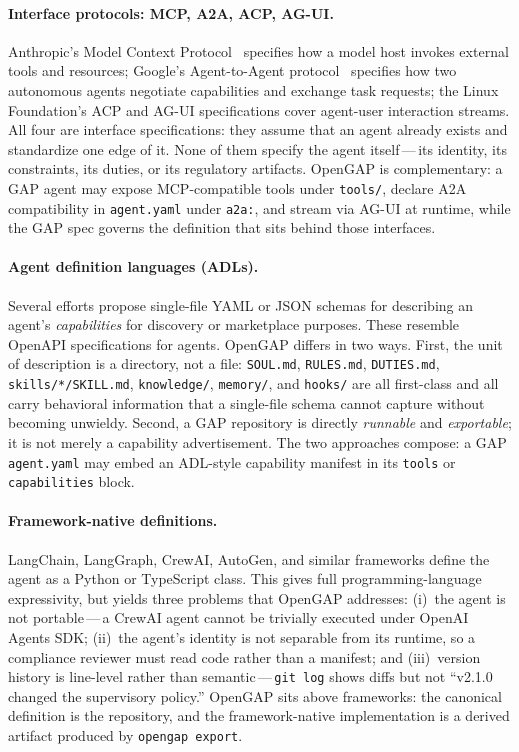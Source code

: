 \documentclass[11pt,a4paper]{article}
\begin{document}
\paragraph{Interface protocols: MCP, A2A, ACP, AG-UI.}
Anthropic's Model Context Protocol~\cite{mcp2024} specifies how a model host invokes
external tools and resources; Google's Agent-to-Agent protocol~\cite{a2a2024} specifies
how two autonomous agents negotiate capabilities and exchange task requests; the Linux
Foundation's ACP and AG-UI specifications cover agent-user interaction streams. All four
are interface specifications: they assume that an agent already exists and standardize
one edge of it. None of them specify the agent itself\,---\,its identity, its
constraints, its duties, or its regulatory artifacts. OpenGAP is complementary: a GAP
agent may expose MCP-compatible tools under \texttt{tools/}, declare A2A compatibility
in \texttt{agent.yaml} under \texttt{a2a:}, and stream via AG-UI at runtime, while the
GAP spec governs the definition that sits behind those interfaces.

\paragraph{Agent definition languages (ADLs).}
Several efforts propose single-file YAML or JSON schemas for describing an agent's
\emph{capabilities} for discovery or marketplace purposes. These resemble OpenAPI
specifications for agents. OpenGAP differs in two ways. First, the unit of description
is a directory, not a file: \texttt{SOUL.md}, \texttt{RULES.md}, \texttt{DUTIES.md},
\texttt{skills/*/SKILL.md}, \texttt{knowledge/}, \texttt{memory/}, and \texttt{hooks/}
are all first-class and all carry behavioral information that a single-file schema
cannot capture without becoming unwieldy. Second, a GAP repository is directly
\emph{runnable} and \emph{exportable}; it is not merely a capability advertisement.
The two approaches compose: a GAP \texttt{agent.yaml} may embed an ADL-style capability
manifest in its \texttt{tools} or \texttt{capabilities} block.

\paragraph{Framework-native definitions.}
LangChain, LangGraph, CrewAI, AutoGen, and similar frameworks define the agent as a
Python or TypeScript class. This gives full programming-language expressivity, but
yields three problems that OpenGAP addresses: (i)~the agent is not portable\,---\,a
CrewAI agent cannot be trivially executed under OpenAI Agents SDK; (ii)~the agent's
identity is not separable from its runtime, so a compliance reviewer must read code
rather than a manifest; and (iii)~version history is line-level rather than
semantic\,---\,\texttt{git log} shows diffs but not ``v2.1.0 changed the supervisory
policy.'' OpenGAP sits above frameworks: the canonical definition is the repository,
and the framework-native implementation is a derived artifact produced by
\texttt{opengap export}.
\end{document}
